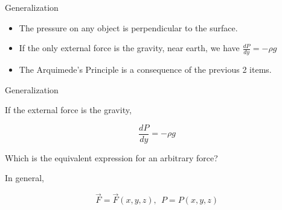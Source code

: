 \documentclass[]{beamer}
\begin{document}
\begin{frame}
  \textcolor{mypink1}{Generalization}
  \vspace{5mm}

\begin{itemize}
\item The pressure on any object is perpendicular to the surface.
\item If the only external force is the gravity, near earth, we have $\frac{dP}{dy}=-\rho g$
\item The Arquimede's Principle is a consequence of the previous 2 items. 
\end{itemize}


  \end{frame}
\begin{frame}
  \textcolor{mypink1}{Generalization}
  \vspace{5mm}



If the external force is the gravity,

\vspace{3mm}

\begin{equation*}
\frac{dP}{dy}=-\rho g 
\end{equation*}

\pause

\vspace{3mm}

Which is the equivalent expression for an arbitrary force?
\vspace{3mm}

\pause
In general,
\vspace{3mm}

\begin{equation}
\vec{F}=\vec{F}(x,y,z), \ \ P=P(x,y,z)
\end{equation}

  \end{frame}
\end{document}
